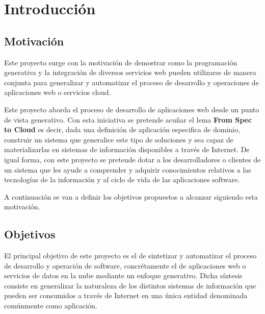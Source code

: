 \documentclass[a4paper,11pt]{book}
\begin{document}


%


\newpage

\newpage

\newpage

\newpage

\tableofcontents
\listoffigures


\chapter{Introducción}

\section{Motivación}

Este proyecto surge con la motivación de demostrar como la programación generativa y  la integración de diversos servicios web pueden utilizarse de manera conjunta para generalizar y automatizar el proceso de desarrollo y operaciones de aplicaciones web o servicios cloud.

Este proyecto aborda el proceso de desarrollo de aplicaciones web desde un punto de vista generativo.  Con esta iniciativa se pretende acuñar el lema \textbf{From Spec to Cloud} es decir, dada una definición de aplicación especifica de dominio, construir un sistema que generalice este tipo de soluciones y sea capaz de materializarlas en sistemas de información disponibles a través de Internet. De igual forma, con este proyecto se pretende dotar a los desarrolladores o clientes de un sistema que les ayude a comprender y adquirir conocimientos relativos a las tecnologías de la información y al ciclo de vida de las aplicaciones software.

A continuación se van a definir los objetivos propuestos a alcanzar siguiendo esta motivación.

\section{Objetivos}

El principal objetivo de este proyecto es el de sintetizar y automatizar el proceso de desarrollo y operación de software, concrétamente el de aplicaciones web o servicios de datos en la nube mediante un enfoque generativo. Dicha síntesis consiste en generalizar la naturaleza de los distintos sistemas de información que pueden ser consumidos a través de Internet en una única entidad denominada comúnmente como aplicación.
\end{document}
